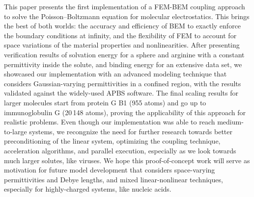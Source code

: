 This paper presents the first implementation of a FEM-BEM coupling approach to solve the Poisson--Boltzmann equation for molecular electrostatics. This brings the best of both worlds: the accuracy and efficiency of BEM to exactly enforce the boundary conditions at infinity, and the flexibility of FEM to account for space variations of the material properties and nonlinearities. After presenting verification results of solvation energy for a sphere and arginine with a constant permittivity inside the solute, and binding energy  for an extensive data set, we showcased our implementation with an advanced modeling technique that considers Gaussian-varying permittivities in a confined region, with the results validated against the widely-used APBS software. The final scaling results for larger molecules start from protein G B1 (955 atoms) and go up to immunoglobulin G (20\,148 atoms), proving the applicability of this approach for realistic problems. Even though our implementation was able to reach medium-to-large systems, we recongnize the need for further research towards better preconditioning of the linear system, optimizing the coupling technique, acceleration algorithms, and parallel execution, especially as we look towards much larger solutes, like viruses. We hope this proof-of-concept work will serve as motivation for future model development that considers space-varying permittivities and Debye lengths, and mixed linear-nonlinear techniques, especially for highly-charged systems, like nucleic acids. 
